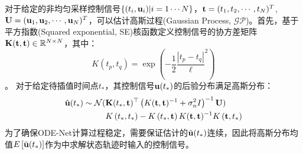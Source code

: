 对于给定的非均匀采样控制信号$\{(t_i, \mathbf u _i)|i=1\cdots N\}$，$\mathbf t = (t_1,t_2,\cdots,t_N)^T$,$\mathbf U = (\mathbf u_1,\mathbf u_2,\cdots,\mathbf u_N)^T$，可以估计高斯过程(Gaussian Process, $\mathcal{GP}$)。首先，基于平方指数(Squared exponential, SE)核函数定义控制信号的协方差矩阵$\mathbf K(\mathbf t, \mathbf t)\in\mathbb{R}^{N\times N}$，其中：
\begin{equation}
K(t_p, t_q) = \exp \left(-\frac{1}{2}\frac{\left|{t}_{p}-{t}_{q}\right|}{\ell}^{2}\right)
\end{equation}。
对于给定待插值时间点$t_*$，其控制信号$\mathbf u(t_*)$的后验分布满足高斯分布：
\begin{equation}
\begin{aligned}
    \hat{\mathbf {u}}(t_*)\sim \mathcal{N}(&\mathbf{K}(t_*,\mathbf t)^{\top}\left(K(\mathbf t,\mathbf t)^{-1}+\sigma_{n}^{2} I\right)^{-1} \mathbf{U}) \\
    &K\left(t_{*}, t_{*}\right)-K\left(t_{*}, \mathbf t\right) K(\mathbf t, \mathbf t)^{-1} K\left(\mathbf t, t_{*}\right)
\end{aligned}
\end{equation}
为了确保ODE-Net计算过程稳定，需要保证估计的$\hat{\mathbf u}(t_*)$连续，因此将高斯分布均值$E\left[\bar{\mathbf u}(t_*)\right]$作为中求解状态轨迹时输入的控制信号。



